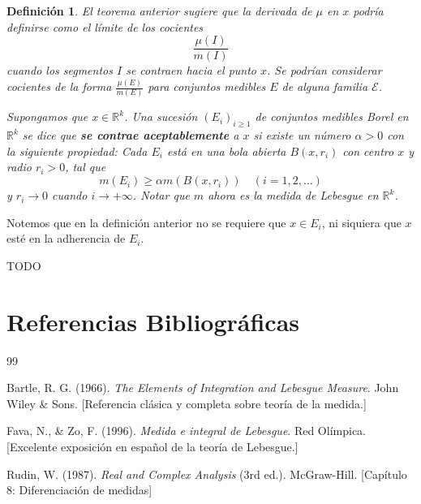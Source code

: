 \documentclass[12pt,a4paper]{article}
\theoremstyle{profesional}
\theoremstyle{definicion-style}
\newtheorem{definicion}[teorema]{Definición}
\newcommand{\R}{\mathbb{R}}
\begin{document}
\begin{definicion}
    El teorema anterior sugiere que la derivada de \( \mu \) en \( x \) podría definirse como el límite de los cocientes \[
        \dfrac{\mu(I)}{m(I)}
    \]
    cuando los segmentos \( I \) se contraen hacia el punto \( x \). Se podrían considerar cocientes de la forma \( \frac{\mu(E)}{m(E)} \) para conjuntos medibles \( E \) de alguna familia \( \mathcal{E} \).

    Supongamos que \( x \in \R^k \). Una sucesión \( {( E_i )}_{i \geq 1} \) de conjuntos medibles Borel en \( \R^k \) se dice que \textbf{se contrae aceptablemente} a \( x \)
    si existe un número \( \alpha > 0 \) con la siguiente propiedad: Cada \( E_i \) está en una bola abierta \( B(x, r_i) \) con centro \( x \) y radio \( r_i > 0 \), tal que \[
        m(E_i) \geq \alpha m(B(x, r_i)) \quad (i = 1, 2, \ldots)
    \]
    y \( r_i \to 0 \) cuando \( i \to +\infty \). Notar que \( m \) ahora es la medida de Lebesgue en \( \R^k \).
\end{definicion}

Notemos que en la definición anterior no se requiere que \( x \in E_i \), ni siquiera que \( x \) esté en la adherencia de \( E_i \).

TODO

\newpage

\section*{Referencias Bibliográficas}

\begin{thebibliography}{99}

     Bartle, R. G. (1966). \textit{The Elements of Integration and Lebesgue Measure}. John Wiley \& Sons. [Referencia clásica y completa sobre teoría de la medida.]

     Fava, N., \& Zo, F. (1996). \textit{Medida e integral de Lebesgue}. Red Olímpica. [Excelente exposición en español de la teoría de Lebesgue.]

     Rudin, W. (1987). \textit{Real and Complex Analysis} (3rd ed.). McGraw-Hill. [Capítulo 8: Diferenciación de medidas]

\end{thebibliography}
\end{document}
